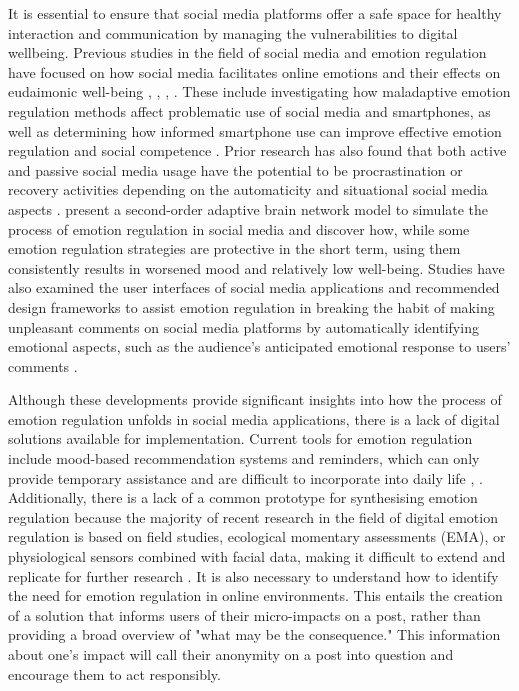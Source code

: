 \documentclass[acmtog]{acmart}
\begin{document}
It is essential to ensure that social media platforms offer a safe space for healthy interaction and communication by managing the vulnerabilities to digital wellbeing. Previous studies in the field of social media and emotion regulation have focused on how social media facilitates online emotions and their effects on eudaimonic well-being \cite{goldenberg2020digital}, \cite{steinert2021corona}, \cite{yang2020social}, \cite{yue2022passive}. These include investigating how maladaptive emotion regulation methods affect problematic use of social media and smartphones, as well as determining how informed smartphone use can improve effective emotion regulation and social competence \cite{zsido2021role}. Prior research has also found that both active and passive social media usage have the potential to be procrastination or recovery activities depending on the automaticity and situational social media aspects \cite{hossain2022motivational}. \cite{ments2021second} present a second-order adaptive brain network model to simulate the process of emotion regulation in social media and discover how, while some emotion regulation strategies are protective in the short term, using them consistently results in worsened mood and relatively low well-being. Studies have also examined the user interfaces of social media applications and recommended design frameworks to assist emotion regulation in breaking the habit of making unpleasant comments on social media platforms by automatically identifying emotional aspects, such as the audience's anticipated emotional response to users' comments \cite{kiskola2021applying}.



Although these developments provide significant insights into how the process of emotion regulation unfolds in social media applications, there is a lack of digital solutions available for implementation. Current tools for emotion regulation include mood-based recommendation systems and reminders, which can only provide temporary assistance and are difficult to incorporate into daily life \cite{wadley2020digital}, \cite{slovak2022designing}. Additionally, there is a lack of a common prototype for synthesising emotion regulation because the majority of recent research in the field of digital emotion regulation is based on field studies, ecological momentary assessments (EMA), or physiological sensors combined with facial data, making it difficult to extend and replicate for further research \cite{ruensuk2020you}. It is also necessary to understand how to identify the need for emotion regulation in online environments. This entails the creation of a solution that informs users of their micro-impacts on a post, rather than providing a broad overview of "what may be the consequence." This information about one's impact will call their anonymity on a post into question and encourage them to act responsibly.
\end{document}
